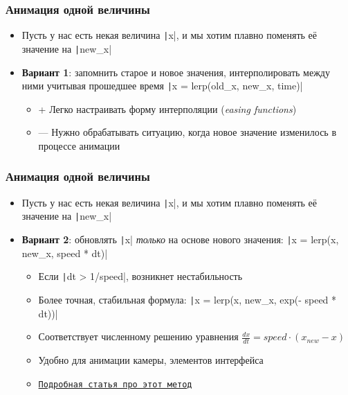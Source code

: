 \documentclass[10pt]{beamer}
\begin{document}
\begin{frame}[fragile]
\frametitle{Анимация одной величины}
\begin{itemize}
\item Пусть у нас есть некая величина \texttt|x|, и мы хотим плавно поменять её значение на \texttt|new_x|
\pause
\item \textbf{Вариант 1}: запомнить старое и новое значения, интерполировать между ними учитывая прошедшее время \texttt|x = lerp(old_x, new_x, time)|
\pause
\begin{itemize}
\item {\color{green}+} Легко настраивать форму интерполяции (\textit{easing functions})
\pause
\item {\color{red}---} Нужно обрабатывать ситуацию, когда новое значение изменилось в процессе анимации
\end{itemize}
\end{itemize}
\end{frame}

\begin{frame}[fragile]
\frametitle{Анимация одной величины}
\begin{itemize}
\item Пусть у нас есть некая величина \texttt|x|, и мы хотим плавно поменять её значение на \texttt|new_x|
\pause
\item \textbf{Вариант 2}: обновлять \texttt|x| \textit{только} на основе нового значения: \texttt|x = lerp(x, new_x, speed * dt)|
\begin{itemize}
\item Если \texttt|dt > 1/speed|, возникнет нестабильность
\pause
\item Более точная, стабильная формула: \texttt|x = lerp(x, new_x, exp(- speed * dt))|
\pause
\item Соответствует численному решению уравнения \begin{math}\frac{dx}{dt} = speed \cdot (x_{new} - x)\end{math}
\pause
\item Удобно для анимации камеры, элементов интерфейса
\pause
\item \href{https://lisyarus.github.io/blog/programming/2023/02/21/exponential-smoothing.html}{\texttt{Подробная статья про этот метод}}
\end{itemize}
\end{itemize}
\end{frame}
\end{document}
